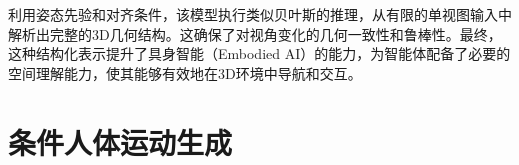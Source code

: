 \documentclass[../../book-main_zh.tex]{subfiles}
\begin{document}
利用姿态先验和对齐条件，该模型执行类似贝叶斯的推理，从有限的单视图输入中解析出完整的3D几何结构。这确保了对视角变化的几何一致性和鲁棒性。最终，这种结构化表示提升了具身智能（Embodied AI）的能力，为智能体配备了必要的空间理解能力，使其能够有效地在3D环境中导航和交互。

\section{条件人体运动生成}
\label{sec:egoallo}

%


\end{document}
